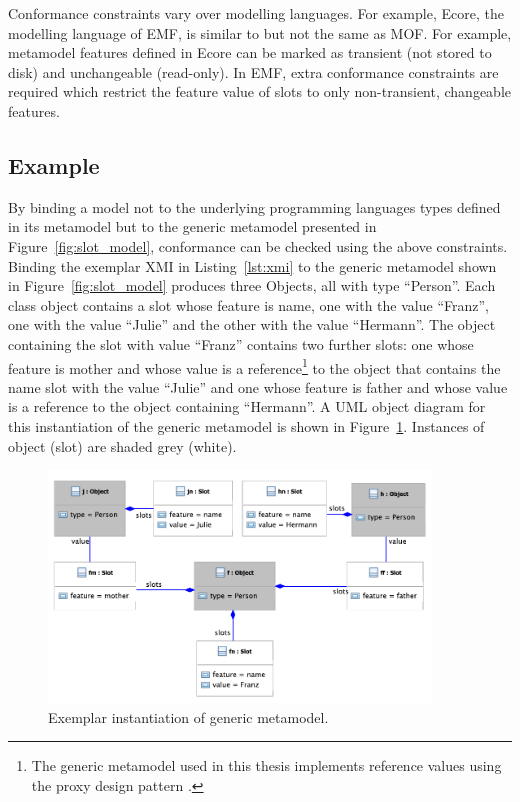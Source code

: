Conformance constraints vary over modelling languages. For example, Ecore, the modelling language of EMF, is similar to but not the same as MOF. For example, metamodel features defined in Ecore can be marked as transient (not stored to disk) and unchangeable (read-only). In EMF, extra conformance constraints are required which restrict the feature value of slots to only non-transient, changeable features.


\subsection{Example}
\label{subsec:mmi_syntax_example}
By binding a model not to the underlying programming languages types defined in its metamodel but to the generic metamodel presented in Figure~\ref{fig:slot_model}, conformance can be checked using the above constraints. Binding the exemplar XMI in Listing~\ref{lst:xmi} to the generic metamodel shown in Figure~\ref{fig:slot_model} produces three Objects, all with type ``Person''. Each class object contains a slot whose feature is name, one with the value ``Franz'', one with the value ``Julie'' and the other with the value ``Hermann''. The object containing the slot with value ``Franz'' contains two further slots: one whose feature is mother and whose value is a reference\footnote{The generic metamodel used in this thesis implements reference values using the proxy design pattern \cite{gamma95patterns}.} to the object that contains the name slot with the value ``Julie'' and one whose feature is father and whose value is a reference to the object containing ``Hermann''. A UML object diagram for this instantiation of the generic metamodel is shown in Figure~\ref{fig:generic_binding}. Instances of object (slot) are shaded grey (white).

\begin{figure}[htbp]
  \centering
  \includegraphics[width=4in]{5.Implementation/GenericBinding.pdf}
  \caption{Exemplar instantiation of generic metamodel.}
  \label{fig:generic_binding}
\end{figure}

